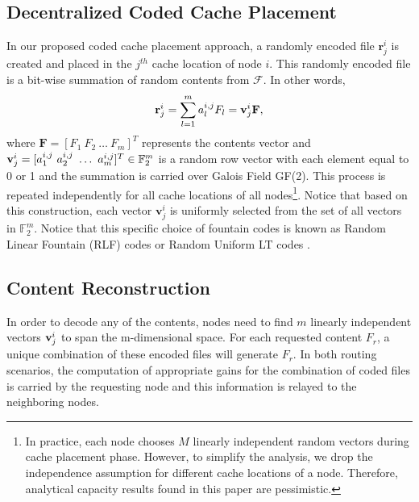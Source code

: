 \documentclass[10pt,journal]{IEEEtran}
\begin{document}
\subsection{Decentralized Coded Cache Placement}
In our proposed coded cache placement approach, a randomly encoded file $\mathbf{r}_j^i$ is created and placed in the $j^{th}$ cache location of node $i$. This randomly encoded file is a bit-wise summation of random contents from $\mathcal{F}$. In other words, 
\begin{equation}
   \mathbf{r}_j^i = \sum_{l=1}^{m} a_l^{i,j} F_l = {\bf v}_{j}^i \mathbf{F},
   \label{eq_def_1}
\end{equation}
 where $\mathbf{F} = [F_{1} ~F_{2} ~\dots~ F_{m}]^T$ represents the contents vector and ${\bf v}_{j}^i = [a_1^{i,j} ~ a_2^{i,j} ~ \dots ~ a_m^{i,j}]^T \in \mathbb{F}_2^{m}$ is a random row vector with each element equal to 0 or 1 and the summation is carried over Galois Field GF(2). This process is repeated independently for all cache locations of all nodes\footnote{In practice, each node chooses $M$ linearly independent random vectors during  cache placement phase. However, to simplify the analysis, we drop the independence assumption for different cache locations of a node. Therefore, analytical capacity results found in this paper are pessimistic.}. Notice that based on this construction, each vector $\mathbf{v}_{j}^i$ is uniformly selected from the set of all vectors in $\mathbb{F}_2^m$. Notice that this specific choice of fountain codes is known as Random Linear Fountain (RLF) codes \cite{mackay2005fountain} or Random Uniform LT codes \cite{DBLP:journals/tit/Shokrollahi06}.
  
 \subsection{Content Reconstruction} 
In order to decode any of the contents, nodes need to find $m$ linearly independent vectors ${\bf v}_{j}^i$ to span the m-dimensional space. For each requested content $F_r$, a unique combination of these encoded files will generate $F_r$. In both routing scenarios, the computation of appropriate gains for the combination of coded files is carried by the requesting node and this information is relayed to the neighboring nodes.
 
\end{document}
